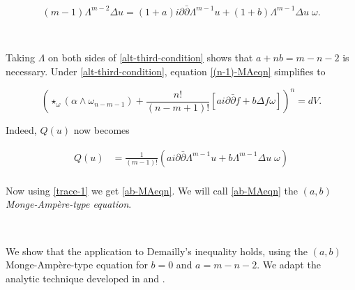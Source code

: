 \documentclass[10pt,a4paper]{amsart}
\newcommand{\pbp}{\partial \bar{\partial}}
\numberwithin{equation}{section}
\begin{document}
\

\begin{equation}\label{alt-third-condition}
     (m-1)\Lambda^{m-2} \Delta u = (1+a) i \pbp \Lambda^{m-1}  u +  (1+b) \Lambda^{m-1} \Delta u \;\omega.
\end{equation}


\

Taking $\Lambda$ on both sides of \eqref{alt-third-condition} shows that $a+nb = m-n-2$ is necessary. Under \eqref{alt-third-condition}, equation \eqref{(n-1)-MAeqn} simplifies to 

\begin{equation}\label{ab-MAeqn}
    \left(\star_{\omega}(\alpha \wedge \omega_{n-m-1}) + \frac{n!}{(n-m+1)!} \left[ a i\pbp f + b \Delta f \omega\right] \right)^n = dV.
    \end{equation}

Indeed, $Q(u)$ now becomes

\begin{equation}
    \begin{aligned}
        Q(u) &= \frac{1}{(m-1)!}\left(a  i \pbp \Lambda^{m-1}  u +  b \Lambda^{m-1} \Delta u \;\omega\right)\\
    \end{aligned}
\end{equation}

 Now using \eqref{trace-1} we get \eqref{ab-MAeqn}. We will call \eqref{ab-MAeqn} the {\em $(a,b)$ Monge-Amp\`ere-type equation}.

\

We show that the application to Demailly's inequality holds, using the $(a,b)$ Monge-Amp\`ere-type equation for $b=0$ and $a= m-n-2$. We adapt the analytic technique developed in \cite{DP25} and \cite{Popovici16}.
\end{document}
